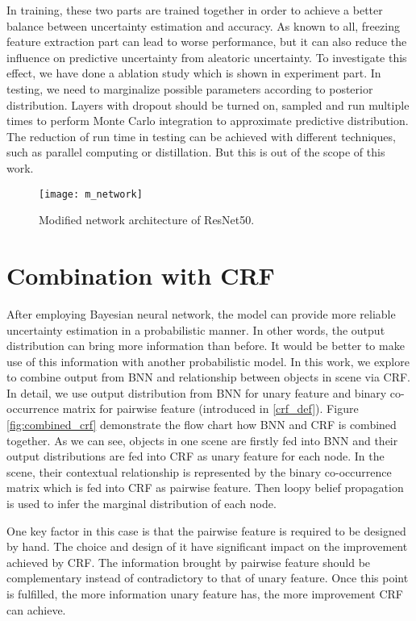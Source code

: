 In training, these two parts are trained together in order to achieve a better balance between uncertainty estimation and accuracy. As known to all, freezing feature extraction part can lead to worse performance, but it can also reduce the influence on predictive uncertainty from aleatoric uncertainty. To investigate this effect, we have done a ablation study which is shown in experiment part. In testing, we need to marginalize possible parameters according to posterior distribution. Layers with dropout should be turned on, sampled and run multiple times to perform Monte Carlo integration to approximate predictive distribution. The reduction of run time in testing can be achieved with different techniques, such as parallel computing or distillation. But this is out of the scope of this work.
\begin{figure}[H]
	\begin{center}
		\texttt{[image: m\_network]}
		\caption{Modified network architecture of ResNet50.}		
		\label{fig:modified_net}
	\end{center}
\end{figure}

\section{Combination with CRF}\label{com_crf}
After employing Bayesian neural network, the model can provide more reliable uncertainty estimation in a probabilistic manner. In other words, the output distribution can bring more information than before. It would be better to make use of this information with another probabilistic model. In this work, we explore to combine output from BNN and relationship between objects in scene via CRF. In detail, we use output distribution from BNN for unary feature and binary co-occurrence matrix for pairwise feature (introduced in \ref{crf_def}). Figure \ref{fig:combined_crf} demonstrate the flow chart how BNN and CRF is combined together. As we can see, objects in one scene are firstly fed into BNN and their output distributions are fed into CRF as unary feature for each node. In the scene, their contextual relationship is represented by the binary co-occurrence matrix which is fed into CRF as pairwise feature. Then loopy belief propagation is used to infer the marginal distribution of each node. 

One key factor in this case is that the pairwise feature is required to be designed by hand. The choice and design of it have significant impact on the improvement achieved by CRF. The information brought by pairwise feature should be complementary instead of contradictory to that of unary feature. Once this point is fulfilled, the more information unary feature has, the more improvement CRF can achieve.

